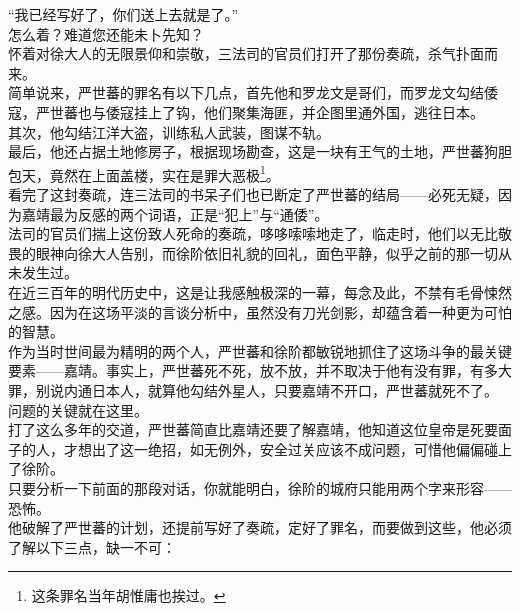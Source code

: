 \begin{multicols}{\theparacolNo}
“我已经写好了，你们送上去就是了。”\\

怎么着？难道您还能未卜先知？\\

怀着对徐大人的无限景仰和崇敬，三法司的官员们打开了那份奏疏，杀气扑面而来。\\

简单说来，严世蕃的罪名有以下几点，首先他和罗龙文是哥们，而罗龙文勾结倭寇，严世蕃也与倭寇挂上了钩，他们聚集海匪，并企图里通外国，逃往日本。\\

其次，他勾结江洋大盗，训练私人武装，图谋不轨。\\

最后，他还占据土地修房子，根据现场勘查，这是一块有王气的土地，严世蕃狗胆包天，竟然在上面盖楼，实在是罪大恶极\footnote{这条罪名当年胡惟庸也挨过。}。\\

看完了这封奏疏，连三法司的书呆子们也已断定了严世蕃的结局——必死无疑，因为嘉靖最为反感的两个词语，正是“犯上”与“通倭”。\\

法司的官员们揣上这份致人死命的奏疏，哆哆嗦嗦地走了，临走时，他们以无比敬畏的眼神向徐大人告别，而徐阶依旧礼貌的回礼，面色平静，似乎之前的那一切从未发生过。\\

在近三百年的明代历史中，这是让我感触极深的一幕，每念及此，不禁有毛骨悚然之感。因为在这场平淡的言谈分析中，虽然没有刀光剑影，却蕴含着一种更为可怕的智慧。\\

作为当时世间最为精明的两个人，严世蕃和徐阶都敏锐地抓住了这场斗争的最关键要素——嘉靖。事实上，严世蕃死不死，放不放，并不取决于他有没有罪，有多大罪，别说内通日本人，就算他勾结外星人，只要嘉靖不开口，严世蕃就死不了。\\

问题的关键就在这里。\\

打了这么多年的交道，严世蕃简直比嘉靖还要了解嘉靖，他知道这位皇帝是死要面子的人，才想出了这一绝招，如无例外，安全过关应该不成问题，可惜他偏偏碰上了徐阶。\\

只要分析一下前面的那段对话，你就能明白，徐阶的城府只能用两个字来形容——恐怖。\\

他破解了严世蕃的计划，还提前写好了奏疏，定好了罪名，而要做到这些，他必须了解以下三点，缺一不可：\\


\end{multicols}
